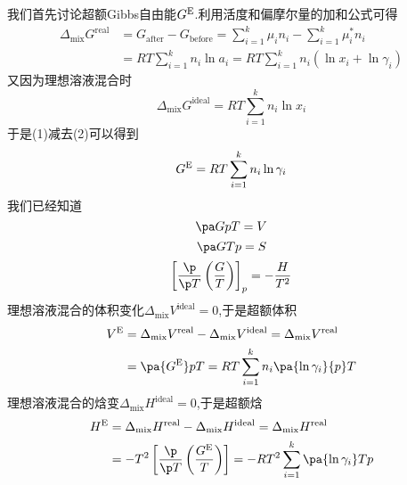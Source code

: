 \documentclass{ctexart}
\begin{document}
\begin{derivation}\setcounter{equation}{0}
    我们首先讨论超额Gibbs自由能$G^\text E$.利用活度和偏摩尔量的加和公式可得
    \begin{equation}
        \begin{aligned}
            \Delta_{\text{mix}}G^{\text{real}}
            &= G_{\text{after}}-G_{\text{before}} = \sum_{i=1}^{k}\mu_in_i-\sum_{i=1}^{k}\mu_i^\ast n_i \\
            &= RT\sum_{i=1}^{k}n_i\ln a_i = RT\sum_{i=1}^{k}n_i\left(\ln x_i+\ln\gamma_i\right)
        \end{aligned}
    \end{equation}
    又因为理想溶液混合时
    \begin{equation}\Delta_{\text{mix}}G^{\text{ideal}}=RT\sum_{i=1}^{k}n_i\ln x_i\end{equation}
    于是(1)减去(2)可以得到
    \begin{equation}G^\text E=RT\sum_{i=1}^{k}n_i\ln\gamma_i\end{equation}
    我们已经知道
    \begin{equation}\pa GpT=V\end{equation}
    \begin{equation}\pa GTp=S\end{equation}
    \begin{equation}
        \left[\dfrac{\p}{\p T}\left(\dfrac{G}{T}\right)\right]_p=-\dfrac{H}{T^2}
    \end{equation}
    理想溶液混合的体积变化$\Delta_{\text{mix}}V^{\text{ideal}}=0$,于是超额体积
    \begin{equation}
        \begin{aligned}
            V^\text E
            &= \Delta_{\text{mix}}V^{\text{real}}-\Delta_{\text{mix}}V^{\text{ideal}}=\Delta_{\text{mix}}V^{\text{real}} \\
            &= \pa{G^\text E}pT=RT\sum_{i=1}^{k}n_i\pa{\ln\gamma_i}{p}T
        \end{aligned}
    \end{equation}
    理想溶液混合的焓变$\Delta_{\text{mix}}H^{\text{ideal}}=0$,于是超额焓
    \begin{equation}
        \begin{aligned}
            H^\text E
            &= \Delta_{\text{mix}}H^{\text{real}}-\Delta_{\text{mix}}H^{\text{ideal}}=\Delta_{\text{mix}}H^{\text{real}} \\
            &= -T^2\left[\dfrac{\p}{\p T}\left(\dfrac{G^\text E}{T}\right)\right]=-RT^2\sum_{i=1}^{k}\pa{\ln\gamma_i}Tp

\end{aligned}
\end{equation}
\end{derivation}
\end{document}
